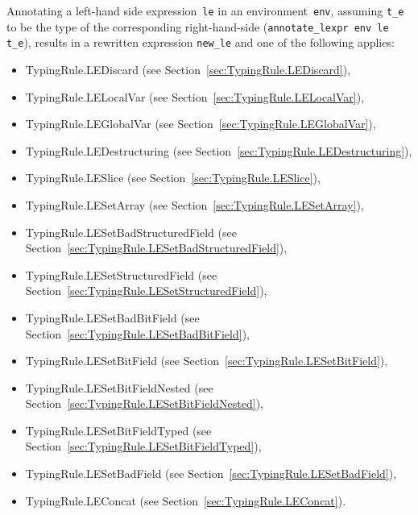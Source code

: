 \documentclass{book}
\begin{document}
Annotating a left-hand side expression~\texttt{le} in an environment~\texttt{env}, assuming \texttt{t\_e}
to be the type of the corresponding right-hand-side (\texttt{annotate\_lexpr env le t\_e}),
results in a rewritten expression \texttt{new\_le} and one of the following applies:
\begin{itemize}
\item TypingRule.LEDiscard (see Section~\ref{sec:TypingRule.LEDiscard}),
\item TypingRule.LELocalVar (see Section~\ref{sec:TypingRule.LELocalVar}),
\item TypingRule.LEGlobalVar (see Section~\ref{sec:TypingRule.LEGlobalVar}),
\item TypingRule.LEDestructuring (see Section~\ref{sec:TypingRule.LEDestructuring}),
\item TypingRule.LESlice (see Section~\ref{sec:TypingRule.LESlice}),
\item TypingRule.LESetArray (see Section~\ref{sec:TypingRule.LESetArray}),
\item TypingRule.LESetBadStructuredField (see Section~\ref{sec:TypingRule.LESetBadStructuredField}),
\item TypingRule.LESetStructuredField (see Section~\ref{sec:TypingRule.LESetStructuredField}),
\item TypingRule.LESetBadBitField (see Section~\ref{sec:TypingRule.LESetBadBitField}),
\item TypingRule.LESetBitField (see Section~\ref{sec:TypingRule.LESetBitField}),
\item TypingRule.LESetBitFieldNested (see Section~\ref{sec:TypingRule.LESetBitFieldNested}),
\item TypingRule.LESetBitFieldTyped (see Section~\ref{sec:TypingRule.LESetBitFieldTyped}),
\item TypingRule.LESetBadField (see Section~\ref{sec:TypingRule.LESetBadField}),
\item TypingRule.LEConcat (see Section~\ref{sec:TypingRule.LEConcat}).
\end{itemize}
\end{document}

